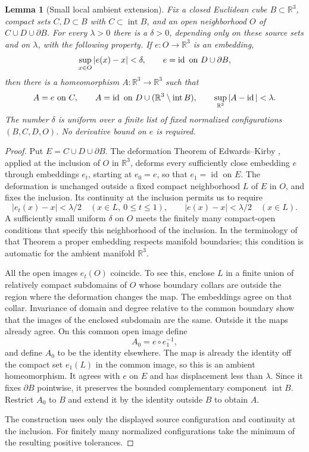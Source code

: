 \documentclass[11pt]{article}
\numberwithin{equation}{section}
\newtheorem{lemma}[theorem]{Lemma}
\theoremstyle{definition}
\theoremstyle{remark}
\newcommand{\R}{\mathbb R}
\newcommand{\Id}{\operatorname{id}}
\begin{document}
\begin{lemma}[Small local ambient extension]
\label{sm:local-extension}
Fix a closed Euclidean cube $B\subset\R^3$, compact sets $C,D\subset B$
with $C\subset\operatorname{int}B$, and an open neighborhood $O$ of
$C\cup D\cup\partial B$.  For every $\lambda>0$ there is a
$\delta>0$, depending only on these source sets and on $\lambda$,
with the following property.  If $e:O\to\R^3$ is an embedding,
\[
 \sup_{x\in O}|e(x)-x|<\delta,
 \qquad e=\Id\ \hbox{on }D\cup\partial B,
\]
then there is a homeomorphism $A:\R^3\to\R^3$ such that
\begin{equation}
 \label{sm:extension-conclusion}
 A=e\ \hbox{on }C,\qquad
 A=\Id\ \hbox{on }D\cup(\R^3\setminus\operatorname{int}B),
 \qquad \sup_{\R^3}|A-\Id|<\lambda.
\end{equation}
The number $\delta$ is uniform over a finite list of fixed normalized
configurations $(B,C,D,O)$.  No derivative bound on $e$ is required.
\end{lemma}

\begin{proof}
Put $E=C\cup D\cup\partial B$.  The deformation Theorem of
Edwards--Kirby \cite[Theorem~5.1]{EdwardsKirby1971}, applied at the
inclusion of $O$ in $\R^3$, deforms every sufficiently close embedding
$e$ through embeddings $e_t$, starting at $e_0=e$, so that
$e_1=\Id$ on $E$.  The deformation is unchanged outside a fixed
compact neighborhood $L$ of $E$ in $O$, and fixes the inclusion.
Its continuity at the inclusion permits us to require
\[
 |e_t(x)-x|<\lambda/2\quad(x\in L,\ 0\le t\le1),
 \qquad |e(x)-x|<\lambda/2\quad(x\in L).
\]
A sufficiently small uniform $\delta$ on $O$ meets the finitely many
compact-open conditions that specify this neighborhood of the
inclusion.  In the terminology of that Theorem a proper embedding
respects manifold boundaries; this condition is automatic for the
ambient manifold $\R^3$.

All the open images $e_t(O)$ coincide.  To see this, enclose $L$ in a
finite union of relatively compact subdomains of $O$ whose boundary collars are outside
the region where the deformation changes the map.  The embeddings
agree on that collar. Invariance of domain
\cite[Theorem~2B.3]{Hatcher2002} and degree relative to
the common boundary show that the images of the enclosed subdomain
are the same.  Outside it the maps already agree.
On this common open image define
\[
 A_0=e\circ e_1^{-1},
\]
and define $A_0$ to be the identity elsewhere.  The map is already
the identity off the compact set $e_1(L)$ in the common image, so
this is an ambient homeomorphism.  It agrees with $e$ on $E$ and has
displacement less than $\lambda$.  Since it fixes $\partial B$
pointwise, it preserves the bounded complementary component
$\operatorname{int}B$.  Restrict $A_0$ to $B$ and extend it by the
identity outside $B$ to obtain $A$.

The construction uses only the displayed source configuration and
continuity at the inclusion.  For finitely many normalized
configurations take the minimum of the resulting positive tolerances.
\end{proof}
\end{document}
